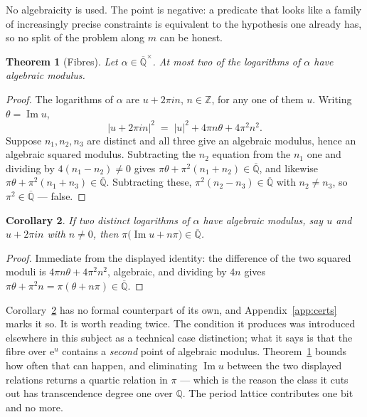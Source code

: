 \documentclass[11pt,a4paper]{article}
\theoremstyle{plain}
\newtheorem{theorem}{Theorem}[section]
\newtheorem{corollary}[theorem]{Corollary}
\theoremstyle{definition}
\newcommand{\e}{\mathrm{e}}
\newcommand{\Q}{\mathbb{Q}}
\newcommand{\Z}{\mathbb{Z}}
\newcommand{\Alg}{\overline{\mathbb{Q}}}
\begin{document}
No algebraicity is used. The point is negative: a predicate that looks like a family of
increasingly precise constraints is equivalent to the hypothesis one already has, so no split of
the problem along $m$ can be honest.

\begin{theorem}[Fibres]\label{thm:fibre}
Let $\alpha\in\Alg^{\times}$. At most two of the logarithms of $\alpha$ have algebraic modulus.
\end{theorem}

\begin{proof}
The logarithms of $\alpha$ are $u+2\pi i n$, $n\in\Z$, for any one of them $u$. Writing
$\theta=\operatorname{Im}u$,
\[
  \lvert u+2\pi i n\rvert^{2}
  \;=\;\lvert u\rvert^{2}+4\pi n\theta+4\pi^{2}n^{2}.
\]
Suppose $n_{1},n_{2},n_{3}$ are distinct and all three give an algebraic modulus, hence an
algebraic squared modulus. Subtracting the $n_{2}$ equation from the $n_{1}$ one and dividing by
$4(n_{1}-n_{2})\neq0$ gives $\pi\theta+\pi^{2}(n_{1}+n_{2})\in\Alg$, and likewise
$\pi\theta+\pi^{2}(n_{1}+n_{3})\in\Alg$. Subtracting these,
$\pi^{2}(n_{2}-n_{3})\in\Alg$ with $n_{2}\neq n_{3}$, so $\pi^{2}\in\Alg$ --- false.
\end{proof}

\begin{corollary}\label{cor:translate}
If two distinct logarithms of $\alpha$ have algebraic modulus, say $u$ and $u+2\pi i n$ with
$n\neq0$, then $\pi\bigl(\operatorname{Im}u+n\pi\bigr)\in\Alg$.
\end{corollary}

\begin{proof}
Immediate from the displayed identity: the difference of the two squared moduli is
$4\pi n\theta+4\pi^{2}n^{2}$, algebraic, and dividing by $4n$ gives
$\pi\theta+\pi^{2}n=\pi(\theta+n\pi)\in\Alg$.
\end{proof}

Corollary~\ref{cor:translate} has no formal counterpart of its own, and Appendix~\ref{app:certs} marks it so. It is worth reading twice. The condition it produces was introduced
elsewhere in this subject as a technical case distinction; what it says is that the fibre over
$\e^{u}$ contains a \emph{second} point of algebraic modulus. Theorem~\ref{thm:fibre} bounds how
often that can happen, and eliminating $\operatorname{Im}u$ between the two displayed relations
returns a quartic relation in $\pi$ --- which is the reason the class it cuts out has
transcendence degree one over $\Q$. The period lattice contributes one bit and no more.
\end{document}
